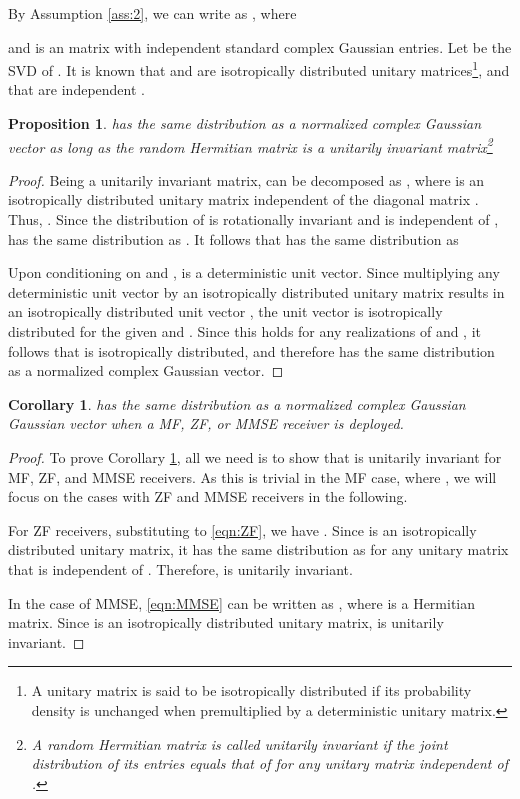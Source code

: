 \documentclass[twocolumn,10pt]{IEEEtran}
\theoremstyle{plain} \newtheorem{theorem}{Theorem}
\theoremstyle{plain} \newtheorem{proposition}{Proposition}
\theoremstyle{plain} \newtheorem{corollary}{Corollary}
\theoremstyle{remark} \newtheorem{remark}{Remark}
\theoremstyle{remark} \newtheorem{lemma}{Lemma}
\theoremstyle{plain} \newtheorem{definition}{Definition}
\theoremstyle{plain} \newtheorem{assumption}{Assumption}
\theoremstyle{plain} \newtheorem{fact}{Fact}
\begin{document}
By Assumption \ref{ass:2}, we can write  as , where

and  is an  matrix with independent standard complex Gaussian entries. Let  be the SVD of . It is known that  and  are isotropically distributed unitary matrices\footnote{A unitary matrix is said to be isotropically distributed if its probability density is unchanged when premultiplied by a deterministic unitary matrix.}, and that  are independent \cite{MH99}.

\begin{proposition} \label{pro:1}
 has the same distribution as a normalized complex Gaussian vector as long as the random Hermitian matrix  is a unitarily invariant matrix\footnote{A random Hermitian matrix  is called unitarily invariant if the joint distribution of its entries equals that of  for any unitary matrix  independent of .}
\end{proposition} 

\begin{proof}
Being a unitarily invariant matrix,  can be decomposed as , where  is an isotropically distributed unitary matrix independent of the diagonal matrix  \cite{TV04}. Thus, . Since the distribution of  is rotationally invariant and  is independent of ,  has the same distribution as . It follows that  has the same distribution as

Upon conditioning on  and ,  is a deterministic unit vector. Since multiplying any deterministic unit vector by an isotropically distributed unitary matrix results in an isotropically distributed unit vector \cite{TV04}, the unit vector  is isotropically distributed for the given  and . Since this holds for any realizations of  and , it follows that  is isotropically distributed, and therefore has the same distribution as a normalized complex Gaussian vector.
\end{proof}

\begin{corollary} \label{cor:1}
 has the same distribution as a normalized complex Gaussian Gaussian vector when a MF, ZF, or MMSE receiver is deployed.
\end{corollary}
\begin{proof}
To prove Corollary \ref{cor:1},  all we need is to show that   is unitarily invariant for MF, ZF, and MMSE receivers. As this is trivial in the MF case, where , we will focus on the cases with ZF and MMSE receivers in the following.

For ZF receivers, substituting   to \eqref{eqn:ZF}, we have . Since  is an isotropically distributed unitary matrix, it has the same distribution as  for any unitary matrix  that is independent of . Therefore,  is unitarily invariant.

In the case of MMSE, \eqref{eqn:MMSE} can be written as , where  is a Hermitian matrix. Since  is an isotropically distributed unitary matrix,  is unitarily invariant.

\end{proof}
\end{document}
